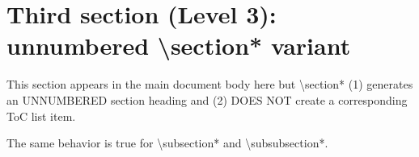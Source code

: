 \section*{Third section (Level 3): unnumbered \textbackslash section* variant}
%
This section appears in the main document body here but \textbackslash section* (1) generates an UNNUMBERED section heading
and (2) DOES NOT create a corresponding ToC list item.

The same behavior is true for \textbackslash subsection* and \textbackslash subsubsection*.
\endinput 